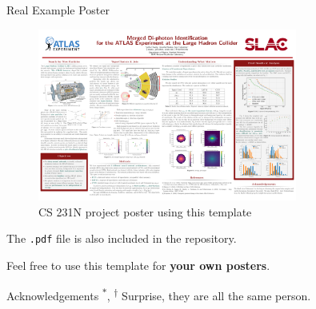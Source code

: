 \documentclass[final]{beamer}
\newlength{\sepwid}
\newlength{\lastcolwid}
\newcommand{\emphg}[1]{{\color{paloalto}\textbf{#1}}}
\begin{document}
\begin{frame}[t]
\begin{columns}[t]
\begin{column}{\lastcolwid}
\begin{alertblock}{Real Example Poster}
		\begin{figure}
			\centering
			\includegraphics[width=0.8\textwidth]{./cs231n_project_poster.pdf}
            \caption{CS 231N project poster using this template}
            \label{fig:roc_architectures}
        \end{figure}
        
        The \texttt{.pdf} file is also included in the repository.
        
        \hspace{1cm}Feel free to use this template for \emphg{your own posters}.
		
	\end{alertblock}
	
	\begin{block}{Acknowledgements}
		\textsuperscript{$*$}, \textsuperscript{$\dagger$} Surprise, they are all the same person.
	\end{block}
\end{column}

\begin{column}{\sepwid}\end{column}

\end{columns}
\end{frame}
\end{document}
